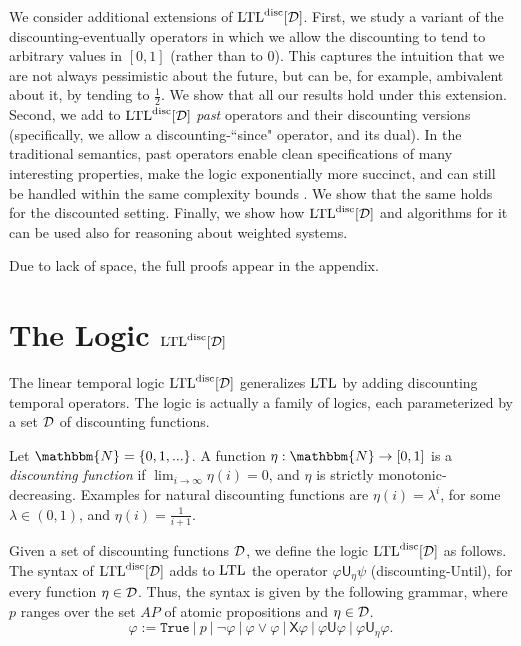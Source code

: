 \documentclass{llncs}
\newcommand{\set}[1]{{\left\{#1\right\}}}
\newcommand{\Nat}{\mathbbm{N}}
\newcommand{\True}{\mathtt{True}}
\newcommand{\LTL}{{\ensuremath{\rm LTL}}\xspace}
\newcommand{\Next}{\mathsf{X}}
\newcommand{\Until}{\mathsf{U}}
\newcommand{\D}{{\cal D}}
\renewcommand{\phi}{\varphi}
\newcommand{\DLTL}{\ensuremath{\LTL^{\text{disc}}[\D]}}
\newcommand{\sep}{~ | ~}
\newcommand{\df}{\eta}
\begin{document}
We consider additional extensions of $\DLTL$. First, we study a variant of the discounting-eventually operators in which we allow the discounting
to tend to arbitrary values in $[0,1]$ (rather than to $0$). This captures the intuition that we are not always pessimistic about the future, but can be, for example, ambivalent about it, by tending to $\frac{1}{2}$. We show that all our results hold under this extension.
Second, we add to $\DLTL$ {\em past\/} operators and their discounting versions (specifically, we allow a discounting-``since" operator, and its dual). In the traditional semantics, past operators enable clean specifications of many interesting properties, make the logic exponentially more succinct, and can still be handled within the same complexity bounds \cite{LS94,LPZ85}. We show that the same holds for the discounted setting.
Finally, we show how $\DLTL$ and algorithms for it can be used also for reasoning about weighted systems.



Due to lack of space, the full proofs appear in the appendix.


\section{The Logic \DLTL}
The linear temporal logic $\DLTL$ generalizes $\LTL$ by adding discounting temporal operators. The logic is actually a family of logics, each parameterized by a set $\D$ of discounting functions.

Let $\Nat=\set{0,1,...}$. A function $\df: \Nat\to [0,1]$ is a {\em discounting function} if $\lim_{i\to \infty}\df(i)=0$, and $\df$ is strictly monotonic-decreasing. Examples for natural discounting functions are $\df(i)=\lambda^i$, for some $\lambda\in (0,1)$, and $\df(i)=\frac{1}{i+1}$.

Given a set of discounting functions $\D$, we define the logic $\DLTL$ as follows. The syntax of $\DLTL$ adds to $\LTL$ the operator $\phi\Until_\df \psi$ (discounting-Until),
for every function $\df\in \D$.
Thus, the syntax is given by the following grammar, where $p$ ranges over the set $AP$ of atomic propositions and $\df\in \D$.
$$\phi:= \True \sep p \sep \neg \phi \sep \phi\vee \phi \sep  \Next \phi \sep \phi\Until \phi \sep \phi\Until_\df \phi.$$
\end{document}
